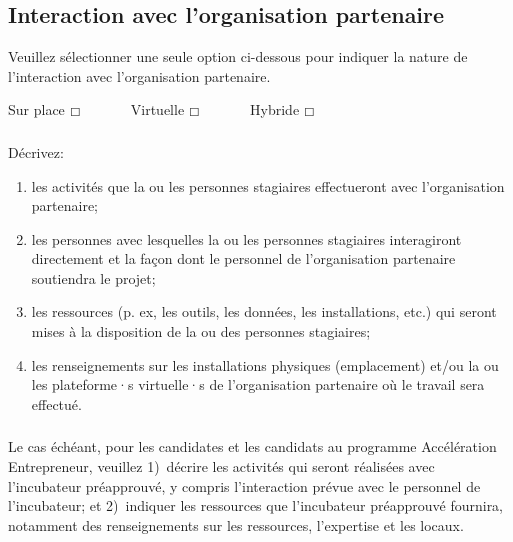 \documentclass{mitacs-acceleration}
\begin{document}

\subsection{Interaction avec l'organisation partenaire} %

\begin{instructions}
Veuillez sélectionner une seule option ci-dessous pour indiquer la nature de l'interaction avec l'organisation partenaire.
\end{instructions}

Sur place  $\boxempty$~~~~~~~Virtuelle  $\boxempty$~~~~~~~Hybride  $\boxempty$



\subsubsection{} \begin{instructions}
Décrivez:
\begin{enumerate}[label=\roman*.]
\item les activités que la ou les personnes stagiaires effectueront avec l'organisation partenaire;
\item les personnes avec lesquelles la ou les personnes stagiaires interagiront directement et la façon dont le personnel de l'organisation partenaire soutiendra le projet;
\item les ressources (p. ex, les outils, les données, les installations, etc.) qui seront mises à la disposition de la ou des personnes stagiaires; 
\item les renseignements sur les installations physiques (emplacement) et/ou la ou les plateforme·s virtuelle·s de l'organisation partenaire où le travail sera effectué.
\end{enumerate}
\end{instructions}

\subsubsection{} \begin{instructions}
Le cas échéant, pour les candidates et les candidats au programme Accélération Entrepreneur, veuillez 1)~décrire les activités qui seront réalisées avec l'incubateur préapprouvé, y compris l'interaction prévue avec le personnel de l'incubateur; et 2)~indiquer les ressources que l'incubateur préapprouvé fournira, notamment des renseignements sur les ressources, l'expertise et les locaux.
\end{instructions}
\end{document}
